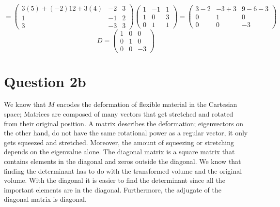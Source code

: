 \documentclass[11pt]{article}
\begin{document}
\[=\begin{pmatrix}
3(5)+(-2)12+3(4) & -2 & 3\\
1 & -1 & 2\\
3 & -3 & 3
\end{pmatrix}
\begin{pmatrix}
1 & -1 & 1\\
1 & 0 & 3\\
0 & 1 & 1
\end{pmatrix}=
\begin{pmatrix}
3-2 & -3+3 & 9-6-3\\
0 & 1 & 0\\
0 & 0 & -3
\end{pmatrix}\]
\[D=\begin{pmatrix}
1 & 0 & 0\\
0 & 1 & 0\\
0 & 0 & -3
\end{pmatrix}\]
\section*{Question 2b}
We know that $M$ encodes the deformation of flexible material in the Cartesian space; Matrices are composed of many vectors that get stretched and rotated from their original position. A matrix describes the deformation; eigenvectors on the other hand, do not have the same rotational power as a regular vector, it only gets squeezed and stretched. Moreover, the amount of squeezing or stretching depends on the eigenvalue alone. The diagonal matrix is a square matrix that contains elements in the diagonal and zeros outside the diagonal. We know that finding the determinant has to do with the transformed volume and the original volume. With the diagonal it is easier to find the determinant since all the important elements are in the diagonal. Furthermore, the adjugate of the diagonal matrix is diagonal.
\end{document}
